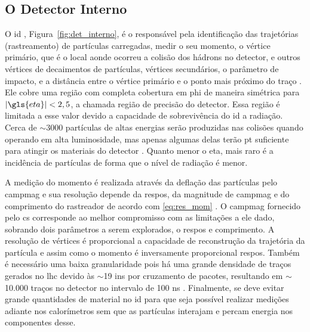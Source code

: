 \subsection{O Detector Interno}
\label{ssec:det_int}



O \gls{id} \cite{inner_tdr1,inner_tdr2}, Figura~\ref{fig:det_interno}, é o responsável pela identificação das 
trajetórias (rastreamento) de partículas carregadas, medir o seu momento, o
vértice primário, que é o local aonde ocorreu a colisão dos hádrons no detector, e outros
vértices de decaimentos de partículas, vértices secundários, o parâmetro de
impacto, e a distância entre o vértice primário e o ponto mais próximo do traço
\cite{tese_jatos,ATLAS_TDR}. Ele cobre uma região com completa cobertura em
\gls{phi} de maneira simétrica para $|\gls{eta}| < 2,5$, a chamada região de precisão
do detector. Essa região é limitada a esse valor devido 
a capacidade de sobrevivência do \gls{id} a radiação. 
Cerca de $\sim3000$ partículas de altas energias serão produzidas nas colisões
quando operando em alta luminosidade, mas apenas algumas delas terão \gls{pt}
suficiente para atingir os materiais do detector \cite{radiacao}. Quanto menor o \gls{eta},
mais raro é a incidência de partículas de forma que o nível de radiação é menor.

A medição do momento é realizada através da deflação das partículas pelo
\gls{campmag} e sua resolução depende da \gls{respos}, da magnitude de
\gls{campmag} e do \gls{comprimento} do rastreador de acordo com \ref{eq:res_mom}
\cite{lecture_slides_1,lecture_slides_2}. O \gls{campmag} fornecido pelo
\gls{cs} corresponde ao melhor compromisso com as limitações a ele dado,
sobrando dois parâmetros a serem explorados, o \gls{respos} e \gls{comprimento}. 
A resolução de vértices é proporcional a
capacidade de reconstrução da trajetória da partícula e assim como o momento
é inversamente proporcional \gls{respos}. 
Também é necessário uma baixa granularidade pois há uma grande densidade de
traços gerados no \gls{lhc} devido às  $\sim$19 \glspl{in} por cruzamento de pacotes,
resultando em $\sim$10.000 traços no detector no intervalo de 100 ns \cite{resumo_ATLAS}.
Finalmente, se deve evitar grande quantidades de material no \gls{id} 
para que seja possível realizar medições adiante nos calorímetros sem que as partículas 
interajam e percam energia nos componentes desse.

